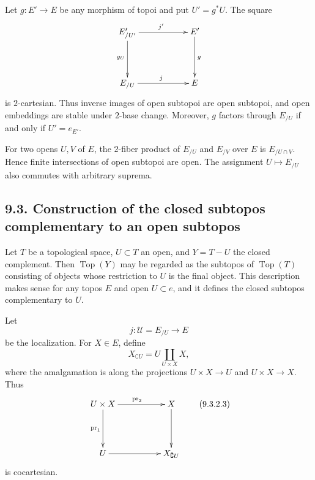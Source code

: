 \documentclass[11pt]{article}
\newcommand{\Uu}{\mathcal{U}}
\newcommand{\Top}{\operatorname{Top}}
\newcommand{\pr}{\operatorname{pr}}
\begin{document}
Let \(g:E'\to E\) be any morphism of topoi and put \(U'=g^*U\). The square
\[
\xymatrix@C=2cm@R=1.5cm{
E'_{/U'}\ar[d]_{g_U}\ar[r]^{j'}&E'\ar[d]^g\\
E_{/U}\ar[r]^j&E
}
\]
is \(2\)-cartesian. Thus inverse images of open subtopoi are open subtopoi, and open embeddings are stable under \(2\)-base change. Moreover, \(g\) factors through \(E_{/U}\) if and only if \(U'=e_{E'}\).

For two opens \(U,V\) of \(E\), the \(2\)-fiber product of \(E_{/U}\) and \(E_{/V}\) over \(E\) is \(E_{/U\cap V}\). Hence finite intersections of open subtopoi are open. The assignment \(U\mapsto E_{/U}\) also commutes with arbitrary suprema.

\subsection*{9.3. Construction of the closed subtopos complementary to an open subtopos}

Let \(T\) be a topological space, \(U\subset T\) an open, and \(Y=T-U\) the closed complement. Then \(\Top(Y)\) may be regarded as the subtopos of \(\Top(T)\) consisting of objects whose restriction to \(U\) is the final object. This description makes sense for any topos \(E\) and open \(U\subset e\), and it defines the closed subtopos complementary to \(U\).

Let
\[
j:\Uu=E_{/U}\longrightarrow E
\tag{9.3.2.1}
\]
be the localization. For \(X\in E\), define
\[
X_{\complement U}=U\coprod_{U\times X}X,
\tag{9.3.2.2}
\]
where the amalgamation is along the projections \(U\times X\to U\) and \(U\times X\to X\). Thus
\[
\xymatrix@C=1.75cm@R=1.5cm{
U\times X\ar[r]^{\pr_2}\ar[d]_{\pr_1}&X\ar[d]\\
U\ar[r]&X_{\complement U}
}
\tag{9.3.2.3}
\]
is cocartesian.
\end{document}
